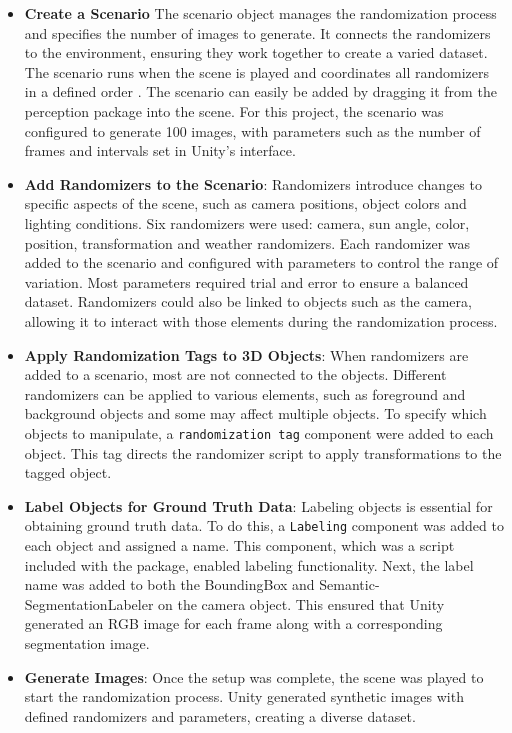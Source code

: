 \begin{itemize} \item \textbf{Create a Scenario}
The scenario object manages the randomization process and specifies the number of images to generate. It connects the randomizers to the environment, ensuring they work together to create a varied dataset. The scenario runs when the scene is played and coordinates all randomizers in a defined order \cite{borkman2021unityperceptiongeneratesynthetic}. The scenario can easily be added by dragging it from the perception package into the scene. For this project, the scenario was configured to generate 100 images, with parameters such as the number of frames and intervals set in Unity’s interface.

\item \textbf{Add Randomizers to the Scenario}: Randomizers introduce changes to specific aspects of the scene, such as camera positions, object colors and lighting conditions. Six randomizers were used: camera, sun angle, color, position, transformation and weather randomizers. Each randomizer was added to the scenario and configured with parameters to control the range of variation. Most parameters required trial and error to ensure a balanced dataset. Randomizers could also be linked to objects such as the camera, allowing it to interact with those elements during the randomization process.

\item \textbf{Apply Randomization Tags to 3D Objects}: When randomizers are added to a scenario, most are not connected to the objects. Different randomizers can be applied to various elements, such as foreground and background objects and some may affect multiple objects. To specify which objects to manipulate, a \texttt{randomization tag} component were added to each object. This tag directs the randomizer script to apply transformations to the tagged object.

\item \textbf{Label Objects for Ground Truth Data}: Labeling objects is essential for obtaining ground truth data. To do this, a \texttt{Labeling} component was added to each object and assigned a name. This component, which was a script included with the package, enabled labeling functionality. Next, the label name was added to both the BoundingBox and Semantic-SegmentationLabeler on the camera object. This ensured that Unity generated an RGB image for each frame along with a corresponding segmentation image.

\item \textbf{Generate Images}: Once the setup was complete, the scene was played to start the randomization process. Unity generated synthetic images with defined randomizers and parameters, creating a diverse dataset.
\end{itemize}


